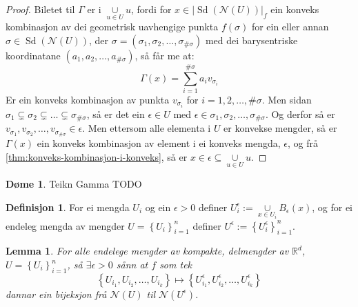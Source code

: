 \documentclass[a4paper, 12pt, norsk]{article}
\theoremstyle{plain}
\newtheorem{lemma}[theorem]{Lemma}
\theoremstyle{definition}
\newtheorem{definition}[theorem]{Definisjon}
\newtheorem{example}[theorem]{Døme}
\newcommand{\Rb}{\mathbb{R}}
\newcommand{\Nc}{\mathcal{N}}
\newcommand{\union}{ \mathop{\cup}\limits }
\newcommand{\gr}[1]{ \lvert #1 \rvert } %
\newcommand{\set}[1]{ \left \{ #1 \right \} } %
\newcommand{\tuple}[1]{ \left( #1 \right) } %
\DeclareMathOperator{\Sd}{Sd}
\begin{document}
\begin{proof}
	Biletet til \( \Gamma \) er i \( \union_{u\in U} u \), fordi for \( x \in \gr{\Sd(\Nc(U))}_f \) ein konveks kombinasjon av dei geometrisk uavhengige punkta \( f(\sigma) \) for ein eller annan \( \sigma \in \Sd(\Nc(U)) \), der \( \sigma = \tuple{\sigma_1, \sigma_2, \dots, \sigma_{\#\sigma}} \) med dei barysentriske koordinatane \( \tuple{a_1, a_2, \dots, a_{\#\sigma}} \), så får me at:
	\[
		\Gamma(x) = \sum_{i=1}^{\#\sigma} a_i v_{\sigma_i}
	\]
	Er ein konveks kombinasjon av punkta \( v_{\sigma_i} \) for \( i = 1,2,\dots,\#\sigma \). Men sidan \( \sigma_1 \subsetneq \sigma_2 \subsetneq \dots \subsetneq \sigma_{\#\sigma} \), så er det ein \( \epsilon \in U \) med \( \epsilon \in \sigma_1, \sigma_2, \dots, \sigma_{\#\sigma} \). Og derfor så er \( v_{\sigma_1}, v_{\sigma_2}, \dots, v_{\sigma_{\#\sigma}} \in \epsilon \). Men ettersom alle elementa i \( U \) er konvekse mengder, så er \( \Gamma(x) \) ein konveks kombinasjon av element i ei konveks mengda, \( \epsilon \), og frå \autoref{thm:konveks-kombinasjon-i-konveks}, så er \( x \in \epsilon \subseteq \union_{u\in U} u \).
\end{proof}

\begin{example}
	Teikn Gamma TODO
\end{example}

\begin{definition} %
	For ei mengda \( U_i \) og ein \( \epsilon > 0 \) definer \( U_i^\epsilon := \union_{x \in U_i} B_\epsilon(x) \), og for ei endeleg mengda av mengder \( U=\set{U_i}_{i=1}^n \) definer \( U^\epsilon := \set{U_i^\epsilon}_{i=1}^n \).
\end{definition}

\begin{lemma} \label{thm:epsilondekke} %
	For alle endelege mengder av kompakte, delmengder av \( \Rb^d \), \( U = \set{U_i}_{i=1}^n \), så \( \exists \epsilon > 0 \) sånn at \(f \) som tek 
	\[ 
		\set{U_{i_1}, U_{i_2}, \dots, U_{i_k}} \mapsto \set{U_{i_1}^\epsilon, U_{i_2}^\epsilon, \dots, U_{i_k}^\epsilon} 
	\] 
	dannar ein bijeksjon frå  \(\Nc(U) \) til \( \Nc(U^\epsilon) \).
\end{lemma}
\end{document}
